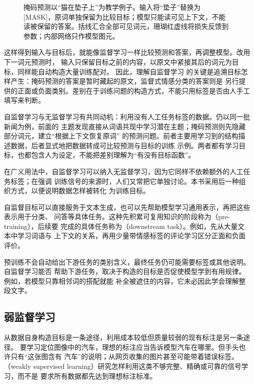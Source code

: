 \begin{figure}[htbp]
  \centering
  
  \caption{掩码预测以“猫在垫子上”为教学例子。输入将“垫子”替换为[MASK]，原词单独保留为比较目标；模型只能读可见上下文，不能读被保留的答案。括线汇合全部可见词元，珊瑚红虚线将损失反馈到参数；内部网络只作模型图元。}
  \label{fig:self-supervised-masked-process}
\end{figure}
\FloatBarrier

这样得到输入与目标后，就能像监督学习一样比较预测和答案，再调整模型。改用下一词元预测时，
输入只保留目标之前的内容，以原文中紧接其后的词元为目标，同样能自动构造大量训练配对。
因此，理解自监督学习
的关键是追溯目标怎样产生：掩码预测的答案是暂时藏起的原文，监督式情感分类的答案则是
另行提供的正面或负面类别。差别在于训练问题的构造方式，不能只用标签是否由人手工填写来判断。

自监督学习与无监督学习有共同动机：利用没有人工任务标签的数据。仍以同一批新闻为例，前面的
主题发现直接从词语共现中学习潜在主题；掩码预测则先隐藏部分词元，建立“根据上下文恢复原词”
的预测问题。前者主要用学习到的结构描述数据，后者显式地把数据转成可比较预测与目标的训练
示例。两者都有学习目标，也都包含人为设定，不能把差别理解为“有没有目标函数”。

在广义用法中，自监督学习可以纳入无监督学习，因为它同样不依赖额外的人工任务标签；在强调
训练信号的来源时，人们又常把它单独讨论。本书采用后一种组织方式，以便说明数据怎样被转化
为训练目标。

自监督目标可以直接服务于文本生成，也可以先帮助模型学习通用表示，再把这些表示用于分类、
问答等具体任务。这种先积累可复用知识的阶段称为（pre-training），后续要
完成的具体任务称为（downstream task）。例如，先从大量文本中学习词语与
上下文的关系，再用少量带情感标签的评论学习区分正面和负面评价。

预训练不会自动给出下游任务的类别含义，最终任务仍可能需要标签或其他说明。自监督学习能否
帮助下游任务，取决于构造的目标是否促使模型学到有用规律。例如，若模型只靠相邻词的搭配就能
补全被遮住的内容，它未必因此学会理解整段文字。

\subsection{弱监督学习}
\label{sec:weakly-supervised-learning}

从数据自身构造目标是一条途径，利用成本较低但质量较弱的现有标注是另一条途径。
要学习定位图像中的汽车，理想的标注应当告诉模型汽车在哪里。但手头也许只有“这张图含有
汽车”的说明；从网页收集的图片甚至可能带着错误标签。
（weakly supervised learning）研究怎样利用这类不够完整、精确或可靠的信号学习，而不是
要求所有数据都先达到理想标注标准。

